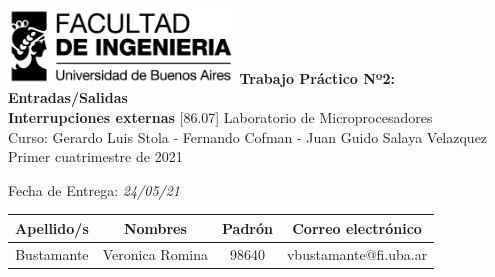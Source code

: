
\begin{titlepage} %
	\hfill\includegraphics[width=6cm]{imagenes/logofiuba.jpg}
    \centering
    \vfill
    \Huge \textbf{Trabajo Práctico Nº2: Entradas/Salidas \\ Interrupciones externas
}
    \vskip 2cm
    \Large [86.07] Laboratorio de Microprocesadores \\
    Curso: Gerardo Luis Stola - Fernando Cofman - Juan Guido Salaya Velazquez\\
    Primer cuatrimestre de 2021 
    \vfill
    
    \vfill
    \Large Fecha de Entrega: \textit{24/05/21}
    
    \vfill
    \begin{tabular}{ | c | c | c | c | } %
      \hline
      Apellido/s & Nombres & Padrón & Correo electrónico \\ \hline \hline
        Bustamante & Veronica Romina & 98640 & vbustamante@fi.uba.ar\\ \hline
      
  	\end{tabular}
    \vfill
    \vfill
\end{titlepage}